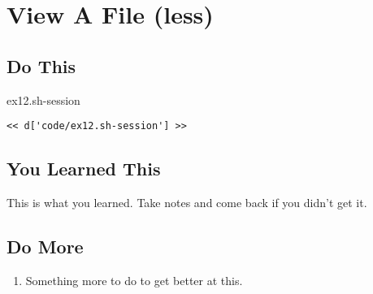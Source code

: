 \chapter{View A File (less)}

\section{Do This}

\begin{code}{ex12.sh-session}
\begin{Verbatim}
<< d['code/ex12.sh-session'] >>
\end{Verbatim}
\end{code}


\section{You Learned This}

This is what you learned.  Take notes and come back if you didn't get it.

\section{Do More}

\begin{enumerate}
\item Something more to do to get better at this.
\end{enumerate}

